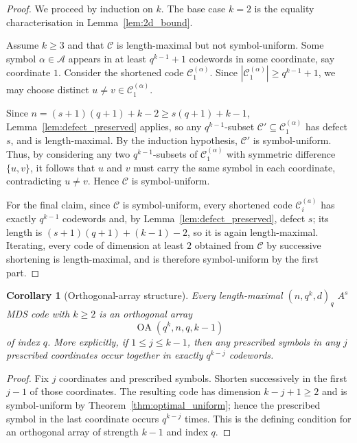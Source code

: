 \documentclass[12pt, letterpaper]{article}
\theoremstyle{plain}
\newtheorem{corollary}[theorem]{Corollary}
\theoremstyle{definition}
\newcommand{\A}{{\mathcal{A}}}
\newcommand{\mc}[1]{\mathcal{#1}}
\begin{document}
	\begin{proof}
		We proceed by induction on $k$. The base case $k=2$ is the equality	characterisation in Lemma~\ref{lem:2d_bound}.
		
		Assume $k \ge 3$ and that $\mathcal{C}$ is length-maximal but not symbol-uniform. Some symbol $\alpha \in \A$ appears in at least $q^{k-1}+1$ codewords in some coordinate, say coordinate $1$. Consider the shortened code  $\mc{C}_1^{(\alpha)}$.	Since $|\mc{C}_1^{(\alpha)}| \ge q^{k-1}+1$, we may choose distinct	$u\ne  v \in \mc{C}_1^{(\alpha)}$.
		
		Since $n = (s+1)(q+1)+k-2 \ge s(q+1)+k-1$, Lemma~\ref{lem:defect_preserved} applies, so any $q^{k-1}$-subset $\mathcal{C}'\subseteq \mc{C}_1^{(\alpha)}$ has defect $s$, and is length-maximal. By the induction hypothesis, $\mc{C}'$  is symbol-uniform. Thus, by considering any two $q^{k-1}$-subsets of $\mc{C}_1^{(\alpha)}$ with symmetric difference $\{u, v\}$, it follows that $u$ and $v$ must carry the same symbol in each coordinate, contradicting $u \ne v$. Hence $\mathcal{C}$ is symbol-uniform.

		For the final claim, since $\mathcal{C}$ is symbol-uniform, every shortened code $\mathcal{C}_i^{(a)}$ has exactly $q^{k-1}$ codewords and, by Lemma~\ref{lem:defect_preserved}, defect $s$; its length is $(s+1)(q+1)+(k-1)-2$, so it is again length-maximal. Iterating, every code of dimension at least $2$ obtained from $\mathcal{C}$ by successive shortening is length-maximal, and is therefore symbol-uniform by the first part.
	\end{proof}

	\begin{corollary}[Orthogonal-array structure]\label{cor:orthogonal_array}
		Every length-maximal $(n,q^k,d)_q$ $A^s$MDS code with $k\ge 2$ is an orthogonal array
		\[
		\operatorname{OA}(q^k,n,q,k-1)
		\]
		of index $q$. More explicitly, if $1\le j\le k-1$, then any prescribed symbols in any $j$ prescribed coordinates occur together in exactly $q^{k-j}$ codewords.
	\end{corollary}

	\begin{proof}
		Fix $j$ coordinates and prescribed symbols. Shorten successively in the first $j-1$ of those coordinates. The resulting code has dimension $k-j+1\ge 2$ and is symbol-uniform by Theorem~\ref{thm:optimal_uniform}; hence the prescribed symbol in the last coordinate occurs $q^{k-j}$ times. This is the defining condition for an orthogonal array of strength $k-1$ and index $q$.
	\end{proof}
	
\end{document}
